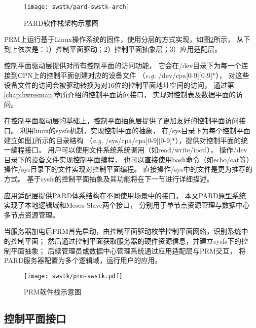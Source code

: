 \begin{figure}[tb]
  \centering
  \texttt{[image: swstk/pard-swstk-arch]}
  \caption{PARD软件栈架构示意图}
  \label{fig:pard-swstk-arch}
\end{figure}


PRM上运行基于Linux操作系统的固件，使用分层的方式实现，如图\ref{fig:prm-swstk}所示，
从下到上依次是：1）控制平面驱动；2）控制平面抽象层；3）应用适配层。

控制平面驱动层提供对所有控制平面的访问功能，
它会在/dev目录下为每一个连接到CPN上的控制平面创建对应的设备文件
（\textit{e.g.} /dev/cpa[0-9][0-9]*），
对这些设备文件的访问会被驱动转换为对16位的控制平面地址空间的访问，
通过第\ref{chap:hwresman}章所介绍的控制平面访问接口，
实现对控制表及数据平面的访问。

在控制平面驱动层的基础上，控制平面抽象层提供了更加友好的控制平面访问接口。
利用linux的sysfs\cite{patrick_mochel_sysfs_2005}机制，实现控制平面的抽象，
在/sys目录下为每个控制平面建立如图\ref{fig:pard-swstk-arch}所示的目录结构
（\textit{e.g.} /sys/cpa/cpa[0-9][0-9]*），提供对控制平面的统一编程接口。
用户可以使用文件系统系统调用（如read/write/ioctl），
操作/dev目录下的设备文件实现控制平面编程，
也可以直接使用bash命令（如echo/cat等）操作/sys目录下的文件实现对控制平面编程。
直接操作/sys中的文件是更为推荐的方式。
基于sysfs的控制平面抽象及其功能将在下一节进行详细描述。

应用适配层提供PARD体系结构在不同使用场景中的接口，
本文PARD原型系统实现了本地逻辑域和Mesos Slave两个接口，
分别用于单节点资源管理与数据中心多节点资源管理。

当服务器加电后PRM首先启动，由控制平面驱动枚举控制平面网络，识别系统中的控制平面；
然后通过控制平面获取服务器的硬件资源信息，并建立sysfs下的控制平面抽象；
后续管理员或数据中心管理系统通过应用适配层与PRM交互，
将PARD服务器配置为多个逻辑域，运行用户的应用。


\begin{figure}[tb]
  \centering
  \texttt{[image: swstk/prm-swstk.pdf]}
  \caption[PRM软件栈示意图]{PRM软件栈示意图}
  \label{fig:prm-swstk}
\end{figure}


\subsection{控制平面接口}
\label{chap:prm:arch:cpabs}

